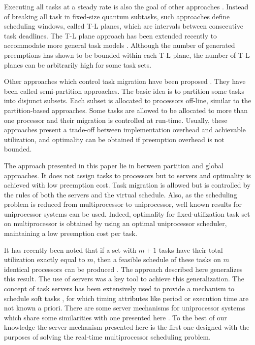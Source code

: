 \documentclass[twocolumn, compsocconf]{IEEEtran}
\newcounter{proc}
\begin{document}
Executing all tasks at a steady rate is also the goal of other approaches
\cite{Cho06,Funaoka08}. Instead of breaking all task in fixed-size quantum
subtasks, such approaches define scheduling windows, called T-L planes, which
are intervals between consecutive task deadlines.
The T-L plane approach has been extended recently to accommodate more general
task models \cite{Funk10}. Although the number of generated preemptions has
shown to be bounded within each T-L plane, the number of T-L planes can be
arbitrarily high for some task sets.


Other approaches which control task migration have been proposed
\cite{Andersson08, Easwaran09, Kato09, Massa10}. They have been called
semi-partition approaches. The basic idea is to partition some tasks into
disjunct subsets. Each subset is allocated to processors off-line, similar to
the partition-based approaches. Some tasks are allowed to be allocated to more
than one processor and their migration is controlled at run-time. Usually, these
approaches present a trade-off between implementation overhead and achievable
utilization, and optimality can be obtained if preemption overhead is not
bounded.

The approach presented in this paper lie in between partition and global
approaches. It does not assign tasks to processors but to servers and optimality
is achieved with low preemption cost. Task migration is allowed but is
controlled by the rules of both the servers and the virtual schedule. Also, as
the scheduling problem is reduced from multiprocessor to uniprocessor, well
known results for uniprocessor systems can be used. Indeed, optimality for
fixed-utilization task set on multiprocessor is obtained by using an optimal
uniprocessor scheduler, maintaining a low preemption cost per task.


It has recently been noted that if a set with $m+1$ tasks have their total
utilization exactly equal to $m$, then a feasible schedule of these tasks on $m$
identical processors can be produced \cite{Levin09}. The approach described here
generalizes this result. The use of servers was a key tool to achieve this
generalization. The concept of task servers has been extensively used to provide
a mechanism to schedule soft tasks \cite{liu00}, for which timing attributes
like period or execution time are not known a priori. There are some server
mechanisms for uniprocessor systems which share some similarities with one
presented here \cite{DLS97,SB96}. To the best of our knowledge the server
mechanism presented here is the first one designed with the purposes of solving
the real-time multiprocessor scheduling problem.
\end{document}
